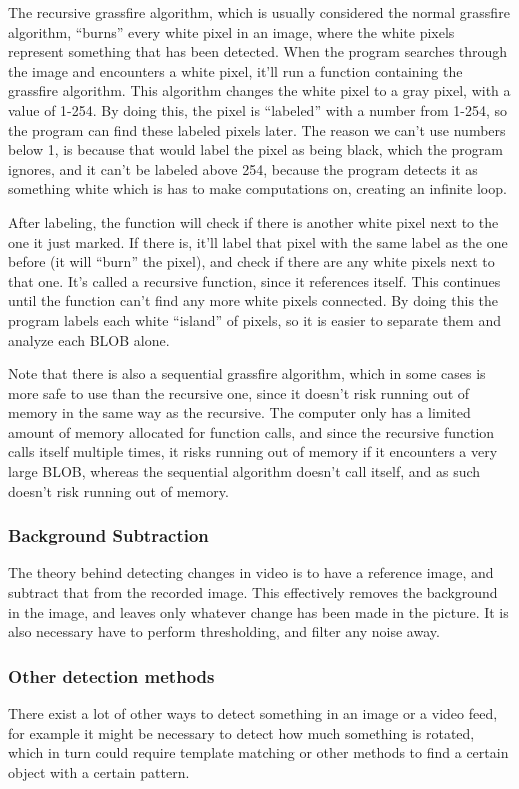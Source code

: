 The recursive grassfire algorithm, which is usually considered the normal grassfire algorithm, “burns” every white pixel in an image, where the white pixels represent something that has been detected. When the program searches through the image and encounters a white pixel, it’ll run a function containing the grassfire algorithm. This algorithm changes the white pixel to a gray pixel, with a value of 1-254. By doing this, the pixel is “labeled” with a number from 1-254, so the program can find these labeled pixels later. The reason we can’t use numbers below 1, is because that would label the pixel as being black, which the program ignores, and it can’t be labeled above 254, because the program detects it as something white which is has to make computations on, creating an infinite loop.

After labeling, the function will check if there is another white pixel next to the one it just marked. If there is, it’ll label that pixel with the same label as the one before (it will “burn” the pixel), and check if there are any white pixels next to that one. It’s called a recursive function, since it references itself. This continues until the function can’t find any more white pixels connected.
By doing this the program labels each white “island” of pixels, so it is easier to separate them and analyze each BLOB alone.

Note that there is also a sequential grassfire algorithm, which in some cases is more safe to use than the recursive one, since it doesn’t risk running out of memory in the same way as the recursive. The computer only has a limited amount of memory allocated for function calls, and since the recursive function calls itself multiple times, it risks running out of memory if it encounters a very large BLOB, whereas the sequential algorithm doesn’t call itself, and as such doesn’t risk running out of memory. \parencite{Moeslund2012}

\subsubsection{Background Subtraction} \label{sec:BGSub}
The theory behind detecting changes in video is to have a reference image, and subtract that from the recorded image. This effectively removes the background in the image, and leaves only whatever change has been made in the picture. It is also necessary have to perform thresholding, and filter any noise away.

\subsubsection{Other detection methods}
There exist a lot of other ways to detect something in an image or a video feed, for example it might be necessary to detect how much something is rotated, which in turn could require template matching or other methods to find a certain object with a certain pattern.

